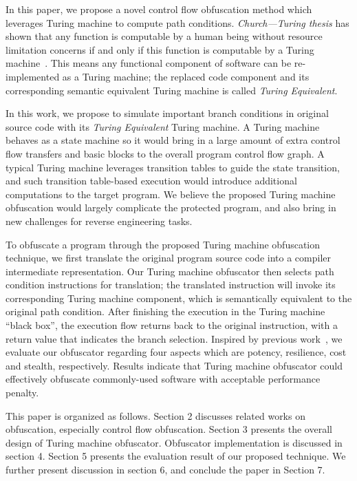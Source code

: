 \documentclass[lnicst]{svmultln}
\begin{document}
In this paper, we propose a novel control flow obfuscation method which
leverages Turing machine to compute path conditions. \textit{Church---Turing
  thesis} has shown that any function is computable by a human being without
resource limitation concerns if and only if this function is computable by a
Turing machine~\cite{Church}. This means any functional component of software
can be re-implemented as a Turing machine; the replaced code component and its
corresponding semantic equivalent Turing machine is called \textit{Turing
  Equivalent}.

In this work, we propose to simulate important branch conditions in original
source code with its \textit{Turing Equivalent} Turing machine. A Turing machine
behaves as a state machine so it would bring in a large amount of extra control
flow transfers and basic blocks to the overall program control flow graph. A
typical Turing machine leverages transition tables to guide the state
transition, and such transition table-based execution would introduce additional
computations to the target program. We believe the proposed Turing machine
obfuscation would largely complicate the protected program, and also bring in
new challenges for reverse engineering tasks.

To obfuscate a program through the proposed Turing machine obfuscation
technique, we first translate the original program source code into a compiler
intermediate representation. Our Turing machine obfuscator then selects path
condition instructions for translation; the translated instruction will invoke
its corresponding Turing machine component, which is semantically equivalent to
the original path condition. After finishing the execution in the Turing machine
``black box'', the execution flow returns back to the original instruction, with
a return value that indicates the branch selection. Inspired by previous
work~\cite{Collberg}, we evaluate our obfuscator regarding four aspects which
are potency, resilience, cost and stealth, respectively. Results indicate that
Turing machine obfuscator could effectively obfuscate commonly-used software
with acceptable performance penalty.

This paper is organized as follows. Section 2 discusses related works on
obfuscation, especially control flow obfuscation. Section 3 presents the overall
design of Turing machine obfuscator. Obfuscator implementation is discussed in
section 4. Section 5 presents the evaluation result of our proposed technique.
We further present discussion in section 6, and conclude the paper in Section 7.
\end{document}
